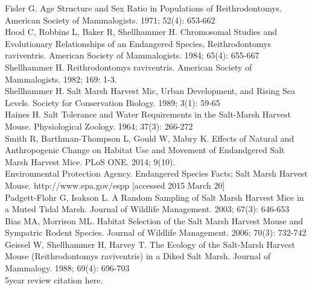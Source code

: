 \documentclass[a4paper]{article}
\begin{document}
Fisler G. Age Structure and Sex Ratio in Populations of Reithrodontomys. American Society of Mammalogists. 1971; 52(4): 653-662\\
Hood C, Robbins L, Baker R, Shellhammer H. Chromosomal Studies and Evolutionary Relationships of an Endangered Species, Reithrodontomys raviventris. American Society of Mammalogists. 1984; 65(4): 655-667\\
Shellhammer H. Reithrodontomys raviventris. American Society of Mammalogists. 1982; 169: 1-3.\\
Shellhammer H. Salt Marsh Harvest Mic, Urban Development, and Rising Sea Levels. Society for Conservation Biology. 1989; 3(1): 59-65\\
Haines H. Salt Tolerance and Water Requirements in the Salt-Marsh Harvest Mouse. Physiological Zoology. 1964; 37(3): 266-272\\
Smith R, Barthman-Thompson L, Gould W, Mabry K. Effects of Natural and Anthropogenic Change on Habitat Use and Movement of Endandgered Salt Marsh Harvest Mice. PLoS ONE. 2014; 9(10).\\
Environmental Protection Agency. Endangered Species Facts; Salt Marsh Harvest Mouse. http://www.epa.gov/espp [accessed 2015 March 20]\\
Padgett-Flohr G, Isakson L. A Random Sampling of Salt Marsh Harvest Mice in a Muted Tidal Marsh. Journal of Wildlife Management. 2003; 67(3): 646-653\\
Bias MA, Morrison ML. Habitat Selection of the Salt Marsh Harvest Mouse and Sympatric Rodent Species. Journal of Wildlife Management. 2006; 70(3): 732-742\\
Geissel W, Shellhammer H, Harvey T. The Ecology of the Salt-Marsh Harvest Mouse (Reithrodontomys raviventris) in a Diked Salt Marsh. Journal of Mammalogy. 1988; 69(4): 696-703\\
5year review citation here.
\end{document}
